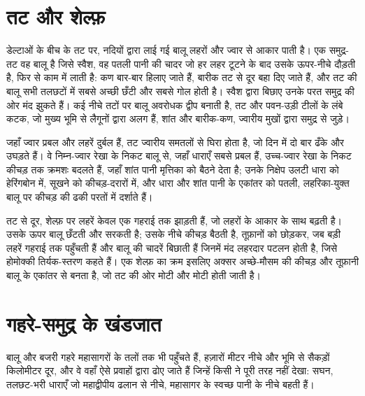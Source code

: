 \section{तट और शेल्फ़}\label{sec:b1:clastic-sediments:shoreline}

डेल्टाओं के बीच के तट पर, नदियों द्वारा लाई गई बालू लहरों और ज्वार से आकार पाती है। एक समुद्र-तट वह बालू है जिसे स्वैश, वह पतली पानी की चादर जो हर लहर टूटने के बाद उसके ऊपर-नीचे दौड़ती है, फिर से काम में लाती है: कण बार-बार हिलाए जाते हैं, बारीक तट से दूर बहा दिए जाते हैं, और तट की बालू सभी तलछटों में सबसे अच्छी छँटी और सबसे गोल होती है। स्वैश द्वारा बिछाए उनके परत समुद्र की ओर मंद झुकते हैं। कई नीचे तटों पर बालू अवरोधक द्वीप बनाती है, तट और पवन-उड़ी टीलों के लंबे कटक, जो मुख्य भूमि से लैगूनों द्वारा अलग हैं, शांत और बारीक-कण, ज्वारीय मुखों द्वारा समुद्र से जुड़े।

जहाँ ज्वार प्रबल और लहरें दुर्बल हैं, तट ज्वारीय समतलों से घिरा होता है, जो दिन में दो बार ढँके और उघड़ते हैं। वे निम्न-ज्वार रेखा के निकट बालू से, जहाँ धाराएँ सबसे प्रबल हैं, उच्च-ज्वार रेखा के निकट कीचड़ तक क्रमशः बदलते हैं, जहाँ शांत पानी मृत्तिका को बैठने देता है; उनके निक्षेप उलटी धारा को हेरिंगबोन  में, सूखने को कीचड़-दरारों में, और धारा और शांत पानी के एकांतर को पतली, लहरिका-युक्त बालू पर कीचड़ की ढकी परतों में दर्शाते हैं।

तट से दूर, शेल्फ़ पर लहरें केवल एक गहराई तक झाड़ती हैं, जो लहरों के आकार के साथ बढ़ती है। उसके ऊपर बालू छँटती और सरकती है; उसके नीचे कीचड़ बैठती है, तूफ़ानों को छोड़कर, जब बड़ी लहरें गहराई तक पहुँचती हैं और बालू की चादरें बिछाती हैं जिनमें मंद लहरदार पटलन होती है, जिसे होमोक्की तिर्यक-स्तरण कहते हैं। एक शेल्फ़ का क्रम इसलिए अक्सर अच्छे-मौसम की कीचड़ और तूफ़ानी बालू के एकांतर से बनता है, जो तट की ओर मोटी और मोटी होती जाती है।

\section{गहरे-समुद्र के खंडजात}\label{sec:b1:clastic-sediments:deep-sea}

बालू और बजरी गहरे महासागरों के तलों तक भी पहुँचते हैं, हज़ारों मीटर नीचे और भूमि से सैकड़ों किलोमीटर दूर, और वे वहाँ ऐसे प्रवाहों द्वारा ढोए जाते हैं जिन्हें किसी ने पूरी तरह नहीं देखा: सघन, तलछट-भरी धाराएँ जो महाद्वीपीय ढलान से नीचे, महासागर के स्वच्छ पानी के नीचे बहती हैं।

